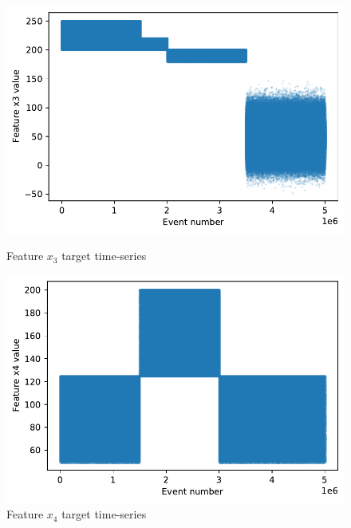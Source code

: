 \begin{figure}[!htb]
\begin{minipage}[b]{0.5\linewidth}
    \includegraphics[width=1\linewidth]{figures/timeseries-t6-x3.pdf} 
    \caption{Feature $x_3$ target time-series} 
    \label{fig:timeseries-t6-x3} 
    \vspace{4ex}
  \end{minipage}%
  \begin{minipage}[b]{0.5\linewidth}
    \centering
    \includegraphics[width=1\linewidth]{figures/timeseries-t6-x4.pdf} 
    \caption{Feature $x_4$ target time-series} 
    \label{fig:timeseries-t6-x4} 
    \vspace{4ex}
  \end{minipage} 
\end{figure}

